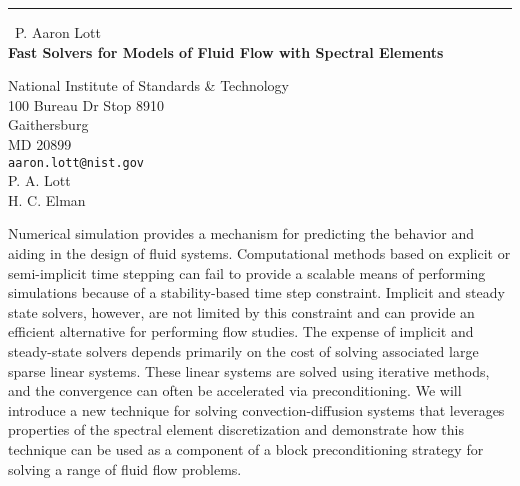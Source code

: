 \documentclass{report}
\begin{document}
\begin{center}
\rule{6in}{1pt} \
{\large P. Aaron Lott \\
{\bf Fast Solvers for Models of Fluid Flow with Spectral Elements}}

National Institute of Standards & Technology \\ 100 Bureau Dr Stop 8910 \\ Gaithersburg \\ MD 20899
\\
{\tt aaron.lott@nist.gov}\\
P. A.  Lott\\
H. C. Elman\end{center}

Numerical simulation provides a mechanism for predicting the behavior and
aiding in the design of fluid systems. Computational methods based on
explicit or semi-implicit time stepping can fail to provide a scalable
means of performing simulations because of a stability-based time step
constraint. Implicit and steady state solvers, however, are not limited
by this constraint and can provide an efficient alternative for
performing flow studies. The expense of implicit and steady-state solvers
depends primarily on the cost of solving associated large sparse linear
systems. These linear systems are solved using iterative methods, and the
convergence can often be accelerated via preconditioning. We will
introduce a new technique for solving convection-diffusion systems that
leverages properties of the spectral element discretization and
demonstrate how this technique can be used as a component of a block
preconditioning strategy for solving a range of fluid flow problems.
\end{document}
